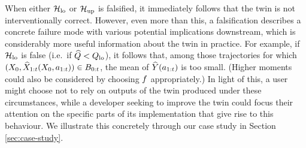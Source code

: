




When either $\mathcal{H}_{\mathrm{lo}}$ or $\mathcal{H}_{\mathrm{up}}$ is falsified, it immediately follows that the twin is not interventionally correct.
However, even more than this, a falsification describes a concrete failure mode with various potential implications downstream, which is considerably more useful information about the twin in practice.
For example, if $\mathcal{H}_{\mathrm{lo}}$ is false (i.e.\ if $\widehat{Q} < Q_{\mathrm{lo}}$), it follows that, among those trajectories for which $(X_0, \widehat{X}_{1:t}(X_0, a_{1:t})) \in B_{0:t}$, the mean of $\widehat{Y}(a_{1:t})$ is too small.
(Higher moments could also be considered by choosing $f$ appropriately.) %
In light of this, a user might choose not to rely on outputs of the twin produced under these circumstances, while a developer seeking to improve the twin could focus their attention on the specific parts of its implementation that give rise to this behaviour.
We illustrate this concretely through our case study in Section \ref{sec:case-study}.


